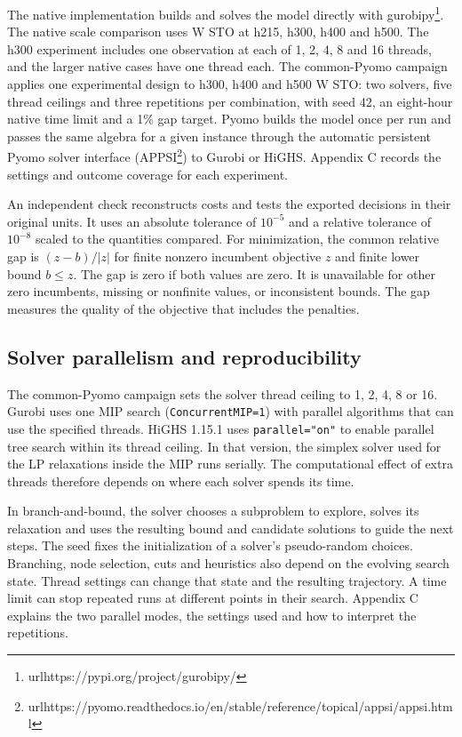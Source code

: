 \documentclass[
  english,
  11pt,
  a4paper,
  authoryear,
  preprint]{elsarticle}
\begin{document}
The native implementation builds and solves the model directly with gurobipy\footnote{url{https://pypi.org/project/gurobipy/}}. The native scale comparison uses W STO at h215, h300,
h400 and h500. The h300 experiment includes one observation at each of
1, 2, 4, 8 and 16 threads, and the larger native cases have one thread
each. The common-Pyomo campaign applies one experimental design to h300,
h400 and h500 W STO: two solvers, five thread ceilings and three
repetitions per combination, with seed 42, an eight-hour native time
limit and a 1\% gap target. Pyomo builds the model once per run and
passes the same algebra for a given instance through the automatic persistent Pyomo solver interface (APPSI\footnote{url{https://pyomo.readthedocs.io/en/stable/reference/topical/appsi/appsi.html}}) to Gurobi or
HiGHS. Appendix C records the settings and outcome coverage for each
experiment.

An independent check reconstructs costs and tests the exported decisions
in their original units. It uses an absolute tolerance of \(10^{-5}\)
and a relative tolerance of \(10^{-8}\) scaled to the quantities
compared. For minimization, the common relative gap is \((z-b)/|z|\) for
finite nonzero incumbent objective \(z\) and finite lower bound
\(b\le z\). The gap is zero if both values are zero. It is unavailable
for other zero incumbents, missing or nonfinite values, or inconsistent
bounds. The gap measures the quality of the objective that includes the
penalties.

\subsection{Solver parallelism and
reproducibility}\label{solver-parallelism-and-reproducibility}

The common-Pyomo campaign sets the solver thread ceiling to 1, 2, 4, 8
or 16. Gurobi uses one MIP search (\texttt{ConcurrentMIP=1}) with
parallel algorithms that can use the specified threads. HiGHS 1.15.1
uses \texttt{parallel="on"} to enable parallel tree search within its
thread ceiling. In that version, the simplex solver used for the LP
relaxations inside the MIP runs serially. The computational effect of
extra threads therefore depends on where each solver spends its time.

In branch-and-bound, the solver chooses a subproblem to explore, solves
its relaxation and uses the resulting bound and candidate solutions to
guide the next steps. The seed fixes the initialization of a solver's
pseudo-random choices. Branching, node selection, cuts and heuristics
also depend on the evolving search state. Thread settings can change
that state and the resulting trajectory. A time limit can stop repeated
runs at different points in their search. Appendix C explains the two
parallel modes, the settings used and how to interpret the repetitions.
\end{document}
